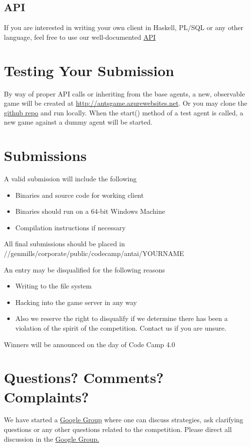 \documentclass{article}
\begin{document}
\subsection{API}
If you are interested in writing your own client in Haskell, PL/SQL or any other language, feel free to use our well-documented \href{http://antsgame.azurewebsites.net/Help}{API}

\section{Testing Your Submission}

By way of proper API calls or inheriting from the base agents, a new, observable game will be created at \url{http://antsgame.azurewebsites.net}. Or you may clone the \href{https://github.com/eonarheim/AntAICompetition}{github repo} and run locally.
\newline
\newline
When the start() method of a test agent is called, a new game against a dummy agent will be started. 

\section{Submissions}
A valid submission will include the following
\begin{itemize}
  \item Binaries and source code for working client
  \item Binaries should run on a 64-bit Windows Machine
  \item Compilation instructions if necessary
\end{itemize}


\noindent All final submissions should be placed in //genmills/corporate/public/codecamp/antai/YOURNAME
\newline
\newline

\noindent An entry may be disqualified for the following reasons
\begin{itemize}
  \item Writing to the file system
  \item Hacking into the game server in any way
  \item  Also we reserve the right to disqualify if we determine there has been a violation of the spirit of the competition. Contact us if you are unsure.
\end{itemize}

\noindent Winners will be announced on the day of Code Camp 4.0

\section{Questions? Comments? Complaints?}

We have started a \href{https://groups.google.com/forum/#!forum/gmi-ant-ai-challenge}{Google Group} where one can discuss strategies, ask clarifying questions or any other questions related to the competition. Please direct all discussion in the \href{https://groups.google.com/forum/#!forum/gmi-ant-ai-challenge}{Google Group.}
\end{document}
